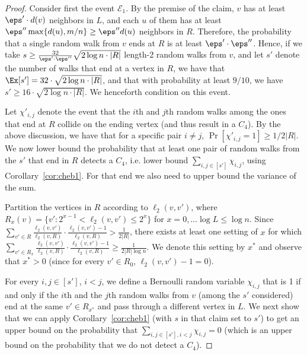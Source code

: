 \begin{proof}
Consider first the event $\mathcal{E}_1$.
By the premise of the claim, $v$ has at least $\eps'\cdot d(v)$ neighbors in $L$, and each $u$ of them has at least $\eps'' \max\{d(u), m/n\}\geq \eps'' d(u)$ neighbors in $R$. Therefore, 
the probability that a single random walk from $v$ ends at $R$ is at least $\eps'\cdot \eps''$. 
Hence, if we take $s\geq  \frac{32}{\eps' \cdot \eps''}\sqrt{2\log n \cdot |R|}$ length-2 random walks from $v$, and let $s'$ denote the number of  walks that end at a vertex in $R$,  we have that $\Ex[s']=32\cdot \sqrt{2\log n \cdot |R|}$, and that with probability at least $9/10$, we have $s' \geq 16\cdot \sqrt{2\log n \cdot |R|}$. We henceforth condition on this event. 

 Let $\chi'_{i,j}$ denote the event that the $i$th and $j$th random walks among the ones that end at $R$ collide on the ending vertex (and thus result in a $C_4$). By the above discussion, we have that for a specific pair $i\neq j$, $\Pr[\chi'_{i,j}=1]\geq 1/2|R|$. We now  lower bound the probability that at least one pair of random walks from the $s'$ that end in $R$ detects a $C_4$, i.e. lower bound $\sum_{i,j\in[s']}\chi_{i,j}$,  using Corollary~\ref{cor:cheb1}. For that end  we also need to upper bound the variance of the sum. 
 
 Partition the vertices in $R$ according to $\ell_2(v,v')$, where $R_x(v) = \{v': 2^{x-1} < \ell_2(v,v') \leq 2^x\}$
for $x = 0, \dots \log L \leq \log n$.
Since $\sum_{v'\in R} \frac{\ell_2(v,v')}{\ell_2(v,R)}\cdot   \frac{\ell_2(v,v')-1}{\ell_2(v,R)}>\frac{1}{2|R|}$,  there exists at least one setting of $x$ for which
$\sum_{v'\in R_x} \frac{\ell_2(v,v')}{\ell_2(v,R)}\cdot   \frac{\ell_2(v,v')-1}{\ell_2(v,R)} \geq \frac{1}{2|R|\log n}$. We denote this setting by $x^*$ and observe that $x^* > 0$ (since for every $v'\in R_0$, $\ell_2(v,v')-1 =0$).

For every $i,j \in [s']$, $i<j$, we define a Bernoulli random variable $\chi_{i,j}$ that is 1 if and only if the $i$th and the $j$th random walks from $v$ (among the $s'$ considered) end at the same $v'\in R_{x^*}$ and pass through a different vertex in $L$. We next show that we can apply Corollary~\ref{cor:cheb1} (with $s$ in that claim set to $s'$) to get an upper bound on the probability that $\sum_{i,j \in [s'], i<j} \chi_{i,j} = 0$ (which is an upper bound on the probability that we do not detect a $C_4$).


\end{proof}
